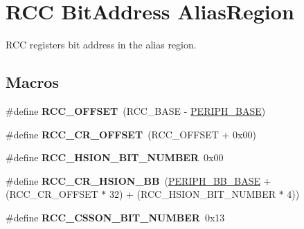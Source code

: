 \hypertarget{group___r_c_c___bit_address___alias_region}{}\section{R\+CC Bit\+Address Alias\+Region}
\label{group___r_c_c___bit_address___alias_region}


R\+CC registers bit address in the alias region.  


\subsection*{Macros}
\begin{DoxyCompactItemize}
\item 
\#define {\bfseries R\+C\+C\+\_\+\+O\+F\+F\+S\+ET}~(R\+C\+C\+\_\+\+B\+A\+SE -\/ \hyperlink{group___peripheral__memory__map_ga9171f49478fa86d932f89e78e73b88b0}{P\+E\+R\+I\+P\+H\+\_\+\+B\+A\+SE})\hypertarget{group___r_c_c___bit_address___alias_region_ga539e07c3b3c55f1f1d47231341fb11e1}{}\label{group___r_c_c___bit_address___alias_region_ga539e07c3b3c55f1f1d47231341fb11e1}

\item 
\#define {\bfseries R\+C\+C\+\_\+\+C\+R\+\_\+\+O\+F\+F\+S\+ET}~(R\+C\+C\+\_\+\+O\+F\+F\+S\+ET + 0x00)\hypertarget{group___r_c_c___bit_address___alias_region_ga6df8d81c05c07cb0c26bbf27ea7fe55c}{}\label{group___r_c_c___bit_address___alias_region_ga6df8d81c05c07cb0c26bbf27ea7fe55c}

\item 
\#define {\bfseries R\+C\+C\+\_\+\+H\+S\+I\+O\+N\+\_\+\+B\+I\+T\+\_\+\+N\+U\+M\+B\+ER}~0x00\hypertarget{group___r_c_c___bit_address___alias_region_ga9bf60daa74224ea82d3df7e08d4533f1}{}\label{group___r_c_c___bit_address___alias_region_ga9bf60daa74224ea82d3df7e08d4533f1}

\item 
\#define {\bfseries R\+C\+C\+\_\+\+C\+R\+\_\+\+H\+S\+I\+O\+N\+\_\+\+BB}~(\hyperlink{group___peripheral__memory__map_gaed7efc100877000845c236ccdc9e144a}{P\+E\+R\+I\+P\+H\+\_\+\+B\+B\+\_\+\+B\+A\+SE} + (R\+C\+C\+\_\+\+C\+R\+\_\+\+O\+F\+F\+S\+ET $\ast$ 32) + (R\+C\+C\+\_\+\+H\+S\+I\+O\+N\+\_\+\+B\+I\+T\+\_\+\+N\+U\+M\+B\+ER $\ast$ 4))\hypertarget{group___r_c_c___bit_address___alias_region_gabd3eca3cc8b1501f9d8a62c4a0ebcfe7}{}\label{group___r_c_c___bit_address___alias_region_gabd3eca3cc8b1501f9d8a62c4a0ebcfe7}

\item 
\#define {\bfseries R\+C\+C\+\_\+\+C\+S\+S\+O\+N\+\_\+\+B\+I\+T\+\_\+\+N\+U\+M\+B\+ER}~0x13\hypertarget{group___r_c_c___bit_address___alias_region_gaa8a1695db870d271a9e79bf0272ec8b6}{}\label{group___r_c_c___bit_address___alias_region_gaa8a1695db870d271a9e79bf0272ec8b6}


\end{DoxyCompactItemize}
